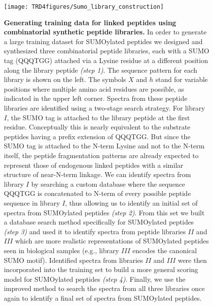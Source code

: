\begin{figure}[h!]
	\centering
		\texttt{[image: TRD4figures/Sumo\_library\_construction]}
		\caption{{\bf Generating training data for linked peptides using combinatorial synthetic peptide libraries.} {\footnotesize In order to generate a large training dataset for SUMOylated peptides we designed and synthesized three combinatorial peptide libraries, each with a SUMO tag (QQQTGG) attached via a Lysine residue at a different position along the library peptide {\em (step 1)}. The sequence pattern for each library is shown on the left.  The symbols $X$ and $h$ stand for variable positions where multiple amino acid residues are possible, as indicated in the upper left corner.  Spectra from these peptide libraries are identified using a two-stage search strategy.  For library $I$, the SUMO tag is attached to the library peptide at the first residue.  Conceptually this is nearly equivalent to the substrate peptides having a prefix extension of QQQTGG. But since the SUMO tag is attached to the N-term Lysine and not to the N-term itself, the peptide fragmentation patterns are already expected to represent those of endogenous linked peptides with a similar structure of near-N-term linkage. We can identify spectra from library $I$ by searching a custom database where the sequence QQQTGG is concatenated to N-term of every possible peptide sequence in library $I$, thus allowing us to identify an initial set of spectra from SUMOylated peptides {\em (step 2)}. From this set we built a database search method specifically for SUMOylated peptides {\em (step 3)} and used it to identify spectra from peptide libraries $II$ and $III$ which are more realistic representations of SUMOylated peptides seen in biological samples (e.g., library $III$ encodes the canonical SUMO motif). Identified spectra from libraries $II$ and $III$ were then incorporated into the training set to build a more general scoring model for SUMOylated peptides {\em (step 4)}. Finally, we use the improved method to search the spectra from all three libraries once again to identify a final set of  spectra from SUMOylated peptides.}}
\label{librarybuild}
\end{figure}


